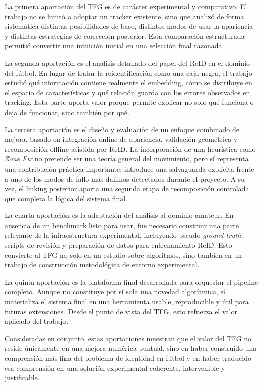 \documentclass[../MAIN.tex]{subfiles}
\begin{document}
	La primera aportación del TFG es de carácter experimental y comparativo. El trabajo no se limitó a adoptar un tracker existente, sino que analizó de forma sistemática distintas posibilidades de base, distintos modos de usar la apariencia y distintas estrategias de corrección posterior. Esta comparación estructurada permitió convertir una intuición inicial en una selección final razonada.
	
	La segunda aportación es el análisis detallado del papel del ReID en el dominio del fútbol. En lugar de tratar la reidentificación como una caja negra, el trabajo estudió qué información contiene realmente el embedding, cómo se distribuye en el espacio de características y qué relación guarda con los errores observados en tracking. Esta parte aporta valor porque permite explicar no solo qué funciona o deja de funcionar, sino también por qué.
	
	La tercera aportación es el diseño y evaluación de un enfoque combinado de mejora, basado en integración online de apariencia, validación geométrica y recomposición offline asistida por ReID. La incorporación de una heurística como \textit{Zone Fix} no pretende ser una teoría general del movimiento, pero sí representa una contribución práctica importante: introduce una salvaguarda explícita frente a uno de los modos de fallo más dañinos detectados durante el proyecto. A su vez, el linking posterior aporta una segunda etapa de recomposición controlada que completa la lógica del sistema final.
	
	La cuarta aportación es la adaptación del análisis al dominio amateur. En ausencia de un benchmark listo para usar, fue necesario construir una parte relevante de la infraestructura experimental, incluyendo pseudo-\textit{ground truth}, scripts de revisión y preparación de datos para entrenamiento ReID. Esto convierte al TFG no solo en un estudio sobre algoritmos, sino también en un trabajo de construcción metodológica de entorno experimental.
	
	La quinta aportación es la plataforma final desarrollada para orquestar el pipeline completo. Aunque no constituye por sí sola una novedad algorítmica, sí materializa el sistema final en una herramienta usable, reproducible y útil para futuras extensiones. Desde el punto de vista del TFG, esto refuerza el valor aplicado del trabajo.
	
	Consideradas en conjunto, estas aportaciones muestran que el valor del TFG no reside únicamente en una mejora numérica puntual, sino en haber construido una comprensión más fina del problema de identidad en fútbol y en haber traducido esa comprensión en una solución experimental coherente, intervenible y justificable.
	
\end{document}
